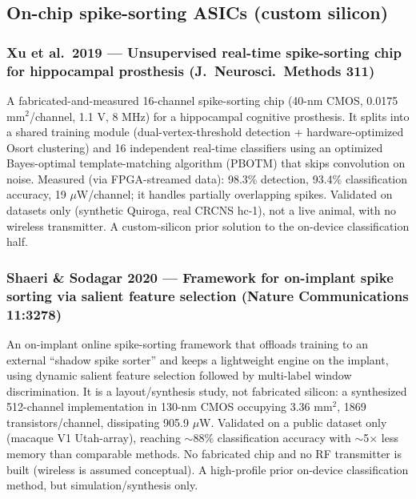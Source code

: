 \documentclass[11pt]{article}
\begin{document}
\subsection*{On-chip spike-sorting ASICs (custom silicon)}

\subsubsection*{Xu et al.\ 2019 --- Unsupervised real-time spike-sorting chip for hippocampal prosthesis (J.\ Neurosci.\ Methods 311)}
A fabricated-and-measured 16-channel spike-sorting chip (40-nm CMOS, 0.0175 mm$^2$/channel, 1.1 V, 8 MHz) for a hippocampal cognitive prosthesis. It splits into a shared training module (dual-vertex-threshold detection + hardware-optimized Osort clustering) and 16 independent real-time classifiers using an optimized Bayes-optimal template-matching algorithm (PBOTM) that skips convolution on noise. Measured (via FPGA-streamed data): 98.3\% detection, 93.4\% classification accuracy, 19 $\mu$W/channel; it handles partially overlapping spikes. Validated on datasets only (synthetic Quiroga, real CRCNS hc-1), not a live animal, with no wireless transmitter. A custom-silicon prior solution to the on-device classification half.

\subsubsection*{Shaeri \& Sodagar 2020 --- Framework for on-implant spike sorting via salient feature selection (Nature Communications 11:3278)}
An on-implant online spike-sorting framework that offloads training to an external ``shadow spike sorter'' and keeps a lightweight engine on the implant, using dynamic salient feature selection followed by multi-label window discrimination. It is a layout/synthesis study, not fabricated silicon: a synthesized 512-channel implementation in 130-nm CMOS occupying 3.36 mm$^2$, 1869 transistors/channel, dissipating 905.9 $\mu$W. Validated on a public dataset only (macaque V1 Utah-array), reaching $\sim$88\% classification accuracy with $\sim$5$\times$ less memory than comparable methods. No fabricated chip and no RF transmitter is built (wireless is assumed conceptual). A high-profile prior on-device classification method, but simulation/synthesis only.
\end{document}
